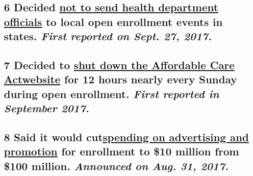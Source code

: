 \hypertarget{6-decided-not-to-send-health-department-officials-to-local-open-enrollment-events-in-states-first-reported-on-sept-27-2017}{%
\subsection{\texorpdfstring{\textbf{6} Decided
\href{https://www.buzzfeed.com/katenocera/the-trump-administration-wont-support-state-obamacare?utm_term=.auMD9xW2e\#.ewQZ90OAn}{not
to send health department officials} to local open enrollment events in
states. \emph{First reported on Sept. 27,
2017.}}{6 Decided not to send health department officials to local open enrollment events in states. First reported on Sept. 27, 2017.}}\label{6-decided-not-to-send-health-department-officials-to-local-open-enrollment-events-in-states-first-reported-on-sept-27-2017}}

\hypertarget{7-decided-to-shut-down-the-affordable-care-actwebsite-for-12-hours-nearly-every-sunday-during-open-enrollment-first-reported-in-september-2017}{%
\subsection{\texorpdfstring{\textbf{7} Decided to
\href{https://www.scribd.com/document/360066165/17-9-27-Booker-Schatz-Murphy-Warren-Letter-to-CMS-Re-HealthCare-gov}{shut
down the Affordable Care
Act}\href{https://www.scribd.com/document/360066165/17-9-27-Booker-Schatz-Murphy-Warren-Letter-to-CMS-Re-HealthCare-gov}{website}
for 12 hours nearly every Sunday during open enrollment. \emph{First
reported in September
2017.}}{7 Decided to shut down the Affordable Care Actwebsite for 12 hours nearly every Sunday during open enrollment. First reported in September 2017.}}\label{7-decided-to-shut-down-the-affordable-care-actwebsite-for-12-hours-nearly-every-sunday-during-open-enrollment-first-reported-in-september-2017}}

\hypertarget{8-said-it-would-cutspending-on-advertising-and-promotion-for-enrollment-to-10-million-from-100-million-announced-on-aug-31-2017}{%
\subsection{\texorpdfstring{\textbf{8} Said it would
cut\href{https://www.nytimes3xbfgragh.onion/2017/08/31/health/affordable-care-act-trump-spending.html}{spending
on advertising and promotion} for enrollment to \$10 million from \$100
million. \emph{Announced on Aug. 31,
2017.}}{8 Said it would cutspending on advertising and promotion for enrollment to \$10 million from \$100 million. Announced on Aug. 31, 2017.}}\label{8-said-it-would-cutspending-on-advertising-and-promotion-for-enrollment-to-10-million-from-100-million-announced-on-aug-31-2017}}

